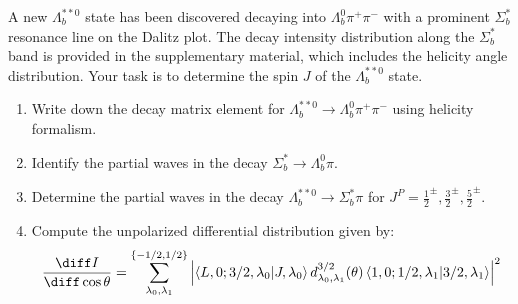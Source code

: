 A new $\Lambda_b^{**0}$ state has been discovered decaying into $\Lambda_b^0 \pi^+ \pi^-$ with a prominent $\Sigma_b^*$ resonance line on the Dalitz plot. The decay intensity distribution along the $\Sigma_b^*$ band is provided in the supplementary material, which includes the helicity angle distribution. Your task is to determine the spin $J$ of the $\Lambda_b^{**0}$ state.

\begin{enumerate}
    \item Write down the decay matrix element for $\Lambda_b^{**0} \to \Lambda_b^0 \pi^+ \pi^-$ using helicity formalism.
    \item Identify the partial waves in the decay $\Sigma_b^* \to \Lambda_b^0 \pi$.
    \item Determine the partial waves in the decay $\Lambda_b^{**0} \to \Sigma_b^* \pi$ for $J^P = \frac{1}{2}^\pm, \frac{3}{2}^\pm, \frac{5}{2}^\pm$.
    \item Compute the unpolarized differential distribution given by:
          $$
              \frac{\diff I}{\diff \cos \theta} = \sum_{\lambda_0, \lambda_1}^{\{-1/2,1/2\}}
              \left| \langle L, 0; 3/2, \lambda_0 | J, \lambda_0 \rangle \,
              d^{3/2}_{\lambda_0, \lambda_1}(\theta)\,
              \langle 1, 0; 1/2, \lambda_1 | 3/2, \lambda_1 \rangle \right|^2
          $$
\end{enumerate}